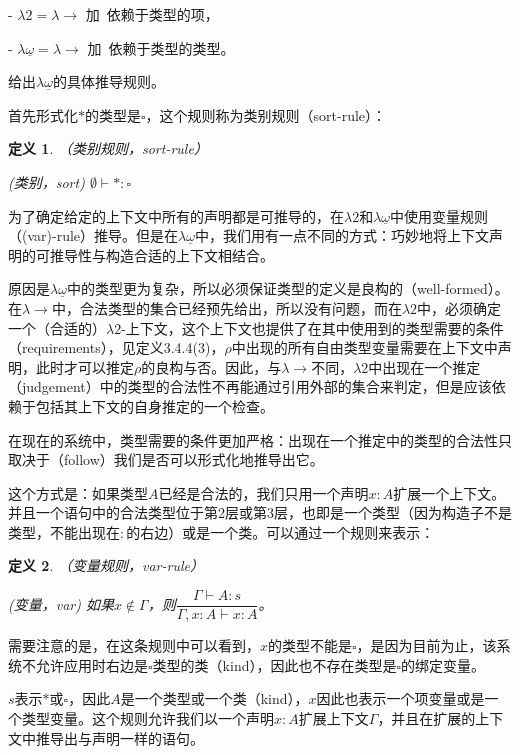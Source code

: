 \documentclass[UTF8]{article}
\newtheorem{thm}{定义}[section]
\begin{document}
		\noindent
		- $\lambda{2} = \lambda{\rightarrow}$ 加\ 依赖于类型的项，
		
		\noindent
		- $\lambda{\underline{\omega}} = \lambda{\rightarrow}$ 加\ 依赖于类型的类型。
		
		给出$\lambda{\underline{\omega}}$的具体推导规则。
		
		首先形式化$*$的类型是$\square$，这个规则称为类别规则（sort-rule）：
		
		\begin{thm} （类别规则，sort-rule）
			
			(类别，sort) $\emptyset \vdash *:\square$
		\end{thm}
	
		为了确定给定的上下文中所有的声明都是可推导的，在$\lambda{2}$和$\lambda{\underline{\omega}}$中使用变量规则（(var)-rule）推导。但是在$\lambda{\underline{\omega}}$中，我们用有一点不同的方式：巧妙地将上下文声明的可推导性与构造合适的上下文相结合。
		
		原因是$\lambda{\underline{\omega}}$中的类型更为复杂，所以必须保证类型的定义是良构的（well-formed）。在$\lambda{\rightarrow}$中，合法类型的集合已经预先给出，所以没有问题，而在$\lambda{2}$中，必须确定一个（合适的）$\lambda{2}$-上下文，这个上下文也提供了在其中使用到的类型需要的条件（requirements），见定义3.4.4(3)，$\rho$中出现的所有自由类型变量需要在上下文中声明，此时才可以推定$\rho$的良构与否。因此，与$\lambda{\rightarrow}$不同，$\lambda{2}$中出现在一个推定（judgement）中的类型的合法性不再能通过引用外部的集合来判定，但是应该依赖于包括其上下文的自身推定的一个检查。
		
		在现在的系统中，类型需要的条件更加严格：出现在一个推定中的类型的合法性只取决于（follow）我们是否可以形式化地推导出它。
		
		这个方式是：如果类型$A$已经是合法的，我们只用一个声明$x:A$扩展一个上下文。并且一个语句中的合法类型位于第2层或第3层，也即是一个类型（因为构造子不是类型，不能出现在$:$的右边）或是一个类。可以通过一个规则来表示：
		
		\begin{thm}（变量规则，var-rule）
			
			(变量，var) 如果$x\not\in\Gamma$，则$\dfrac{\Gamma\vdash A:s}{\Gamma,x:A\vdash x:A}$。
		\end{thm}

		需要注意的是，在这条规则中可以看到，$x$的类型不能是$\square$，是因为目前为止，该系统不允许应用时右边是$\square$类型的类（kind），因此也不存在类型是$\square$的绑定变量。

		$s$表示$*$或$\square$，因此$A$是一个类型或一个类（kind），$x$因此也表示一个项变量或是一个类型变量。这个规则允许我们以一个声明$x:A$扩展上下文$\Gamma$，并且在扩展的上下文中推导出与声明一样的语句。
\end{document}
